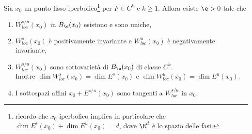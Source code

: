 \begin{theorem}\label{TeoremaVarietaStabileInstabile}
Sia $x_0$ un punto fisso iperbolico\footnote{ricordo che $x_0$ iperbolico implica in particolare che $\dim E^s(x_0)+\dim E^u(x_0)=d$, dove $\R^d$ \`e lo spazio delle fasi.} per $F\in C^k$ e $k\geq 1$. Allora esiste $\e>0$ tale che
\setlength{\leftmargini}{0.5cm}
\begin{enumerate}
\item $W_{loc}^{s/u}(x_0)$ in $B_\e(x_0)$ esistono e sono uniche,
\item $W^s_{loc}(x_0)$ \`e positivamente invariante e $W^u_{loc}(x_0)$ \`e negativamente invariante,
\item $W^{s/u}_{loc}(x_0)$ sono sottovariet\`a di $B_\e(x_0)$ di classe $C^k$.\\
Inoltre $\dim W^s_{loc}(x_0)=\dim E^s(x_0)$ e $\dim W^u_{loc}(x_0)=\dim E^u(x_0)$.
\item I sottospazi affini $x_0+E^{s/u}(x_0)$ sono tangenti a $W^{s/u}_{loc}$ in $x_0$.
\end{enumerate}
\end{theorem}
